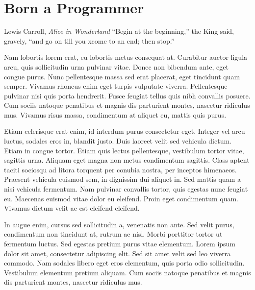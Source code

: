 \chapter{Born a Programmer}

\begin{chapquote}{Lewis Carroll, \textit{Alice in Wonderland}}
``Begin at the beginning,'' the King said, gravely, ``and go on till you
xcome to an end; then stop.''
\end{chapquote}

Nam lobortis lorem erat, eu lobortis metus consequat at. Curabitur auctor ligula arcu, quis sollicitudin urna pulvinar vitae. Donec non bibendum ante, eget congue purus. Nunc pellentesque massa sed erat placerat, eget tincidunt quam semper. Vivamus rhoncus enim eget turpis vulputate viverra. Pellentesque pulvinar nisi quis porta hendrerit. Fusce feugiat tellus quis nibh convallis posuere. Cum sociis natoque penatibus et magnis dis parturient montes, nascetur ridiculus mus. Vivamus risus massa, condimentum at aliquet eu, mattis quis purus.

Etiam celerisque erat enim, id interdum purus consectetur eget. Integer vel arcu luctus, sodales eros in, blandit justo. Duis laoreet velit sed vehicula dictum. Etiam in congue tortor. Etiam quis lectus pellentesque, vestibulum tortor vitae, sagittis urna. Aliquam eget magna non metus condimentum sagittis. Class aptent taciti sociosqu ad litora torquent per conubia nostra, per inceptos himenaeos. Praesent vehicula euismod sem, in dignissim dui aliquet in. Sed mattis quam a nisi vehicula fermentum. Nam pulvinar convallis tortor, quis egestas nunc feugiat eu. Maecenas euismod vitae dolor eu eleifend. Proin eget condimentum quam. Vivamus dictum velit ac est eleifend eleifend.

In augue enim, cursus sed sollicitudin a, venenatis non ante. Sed velit purus, condimentum non tincidunt at, rutrum ac nisl. Morbi porttitor tortor ut fermentum luctus. Sed egestas pretium purus vitae elementum. Lorem ipsum dolor sit amet, consectetur adipiscing elit. Sed sit amet velit sed leo viverra commodo. Nam sodales libero eget eros elementum, quis porta odio sollicitudin. Vestibulum elementum pretium aliquam. Cum sociis natoque penatibus et magnis dis parturient montes, nascetur ridiculus mus.